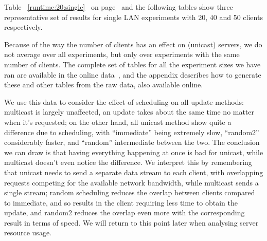 \documentclass[a4paper,11pt,twocolumn]{article}
\newcommand{\TODO}[1]{\par\noindent%
\hspace*{\fill}%
\framebox{\parbox{0.9\linewidth}{{\bf TODO: }#1}}%
\hspace*{\fill}%
}
\newcommand{\pref}[1]{%
\ref{#1}%
\ifnum\thepage=0\pageref{#1}\else\ on page~\pageref{#1}\fi%
}
\begin{document}
Table~\pref{runtime:20:single} and the following tables show three
representative set of results for single LAN experiments with 20,
40 and 50 clients respectively.
Because of the way the number of clients has an effect on (unicast)
servers, we do not average over all experiments, but only over experiments
with the same number of clients. The complete set of tables for all
the experiment sizes we have ran are available in the online data~\cite{data},
and the appendix describes how to generate these and other tables
from the raw data, also available online.

\TODO{Show graphs}

We use this data to consider the effect of scheduling on all update
methods: multicast is largely unaffected, an update takes about the
same time no matter when it's requested; on the other hand, all unicast
method show quite a difference due to scheduling, with ``immediate''
being extremely slow, ``random2'' considerably faster, and ``random''
intermediate between the two. The conclusion we can draw is that having
everything happening at once is bad for unicast, while multicast doesn't
even notice the difference.  We interpret this by remembering that unicast
needs to send a separate data stream to each client, with overlapping
requests competing for the available network bandwidth, while multicast
sends a single stream; random scheduling reduces the overlap between
clients compared to immediate, and so results in the client requiring
less time to obtain the update, and random2 reduces the overlap even
more with the corresponding result in terms of speed.  We will return
to this point later when analysing server resource usage.
\end{document}
